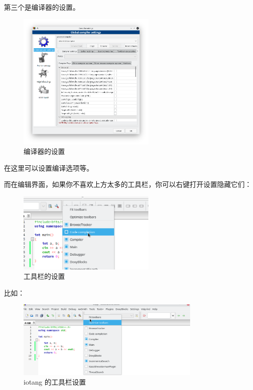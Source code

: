 \documentclass[UTF-8]{ctexart}
\begin{document}
				第三个是编译器的设置。
				
				\begin{figure}[H]
					\centering
					\includegraphics[width=0.6\textwidth]{fig/cb_settings_compiler.png}
					\caption*{编译器的设置}
				\end{figure}
			
				在这里可以设置编译选项等。
				
				而在编辑界面，如果你不喜欢上方太多的工具栏，你可以右键打开设置隐藏它们：
				
				\begin{figure}[H]
					\centering
					\includegraphics[width=0.6\textwidth]{fig/cb_settings_docks.png}
					\caption*{工具栏的设置}
				\end{figure}
			
				比如：
				
				\begin{figure}[H]
					\centering
					\includegraphics[width=0.8\textwidth]{fig/cb_settings_docks_2.png}
					\caption*{iotang 的工具栏设置}
				\end{figure}
			
\end{document}
